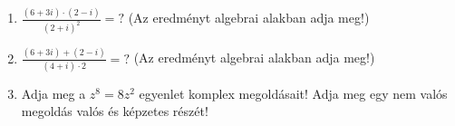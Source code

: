 \documentclass[11pt]{scrartcl}
\begin{document}
\begin{enumerate}
	\item \(\displaystyle
	      \frac{(6 + 3i) \cdot (2 - i)}{(2 + i)^2} = ?
	      \) (Az eredményt algebrai alakban adja meg!)

	\item \(\displaystyle
	      \frac{(6 + 3i) + (2 - i)}{(4 + i) \cdot 2} = ?
	      \) (Az eredményt algebrai alakban adja meg!)

	\item Adja meg a $z^8 = 8z^2$ egyenlet komplex megoldásait! Adja meg egy
	      nem valós megoldás valós és képzetes részét!
\end{enumerate}
\end{document}
